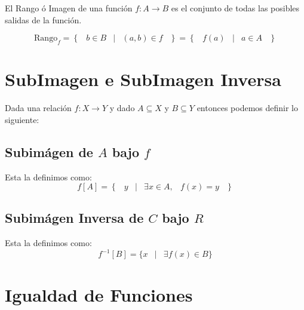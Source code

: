 \documentclass[12pt, fleqn]{report}                             %
\DeclareMathOperator \Space {\quad}                             %
\DeclareMathOperator \MiniSpace {\;}                            %
\newcommand \Such {\MiniSpace|\MiniSpace}                       %
\newcommand{\Set}[1]{\left\{ \MiniSpace #1 \MiniSpace \right\}} %
\begin{document}
                El Rango ó Imagen de una función $f : A \to B$ es el conjunto de todas las posibles salidas
                de la función.

                \begin{equation}
                    \text{Rango}_f = \Set{b \in B \Such (a,b) \in f} = \Set{ f(a) \Such a \in A}
                \end{equation}




        \clearpage
        \section{SubImagen e SubImagen Inversa}

            Dada una relación $f: X \to Y$ y dado $A \subseteq X$ y $B \subseteq Y$
            entonces podemos definir lo siguiente:

            \subsection*{Subimágen de $A$ bajo $f$}
                
                Esta la definimos como:
                \begin{equation*}
                    f[A] = \Set{ y \Such \exists x \in A, \MiniSpace f(x) = y }
                \end{equation*}


            \subsection*{Subimágen Inversa de $C$ bajo $R$}

                Esta la definimos como:
                \begin{equation*}
                    f^{-1}[B] = \{ x \Such \exists f(x) \in B\}
                \end{equation*}

        \section{Igualdad de Funciones}
\end{document}
